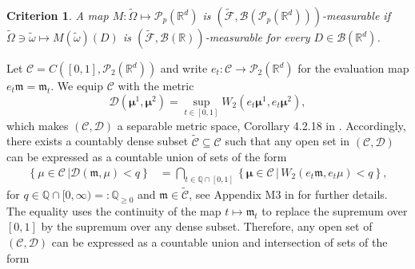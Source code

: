\documentclass{article}
\newtheorem{criterion}{Criterion}
\newcommand{\R}{\mathbb{R}}
\begin{document}
\begin{appendices}
\begin{criterion} \label{criterion:measure}
A map $M: \widetilde{\Omega}\mapsto\mathcal P_p(\R^d)$ is $(\widetilde{\mathcal F}, \mathcal B(\mathcal P_p(\R^d)))$-measurable if $\widetilde{\Omega}\ni\tilde{\omega}\mapsto M(\tilde\omega)(D)$ is $(\widetilde{\mathcal F},\mathcal B(\R))$-measurable for every $D \in \mathcal B(\R^d)$.
\end{criterion}
Let $\mathcal C=C([0,1],\mathcal P_2(\R^d))$ and write $e_t:\mathcal C\to \mathcal P_2(\R^d)$ for the evaluation map $e_t \bm{\mathfrak{m}}= \mathfrak{m}_t$. We equip $\mathcal C$ with the metric
\begin{equation}\label{eqn:UnifromMetric}
    \mathcal D(\bm{\mu}^1, \bm{\mu}^2)= \sup_{t\in[0,1]}W_2(e_t\bm\mu^1,e_t\bm\mu^2),
\end{equation}
which makes $(\mathcal C,\mathcal D)$
a separable metric space, Corollary 4.2.18 in \cite{Eng89}. Accordingly, there exists a countably dense subset $\widetilde{\mathcal C}\subseteq \mathcal C$ such that any open set in $(\mathcal C,\mathcal D)$ can be expressed as a countable union of sets of the form
\begin{align*}
\left\{\bm{\mathfrak{\mu}}\in \mathcal C\,|\mathcal D( \bm{\mathfrak{m}},\bm{\mathfrak{\mu}})<q\right\}  
& = \bigcap_{t\in \mathbb Q \cap [0,1]}\left\{\bm{\mu}\in \mathcal C \,|\,W_2(e_t\bm{\mathfrak{m}},e_t\bm{\mathfrak{\mu}})<q \right\},
\end{align*}
for $q\in \mathbb Q \cap [0,\infty)=: \mathbb Q_{\ge 0}$ and $\bm{\mathfrak{m}}\in \widetilde{\mathcal C}$, see Appendix M3 in \cite{billingsley2013convergence} for further details. The equality uses the continuity of the map $t\mapsto\mathfrak{m}_t$ to replace the supremum over $[0,1]$ by the supremum over any dense subset. Therefore, any open set of $(\mathcal C,\mathcal D)$ can be expressed as a countable union and intersection of sets of the form

\end{appendices}
\end{document}
